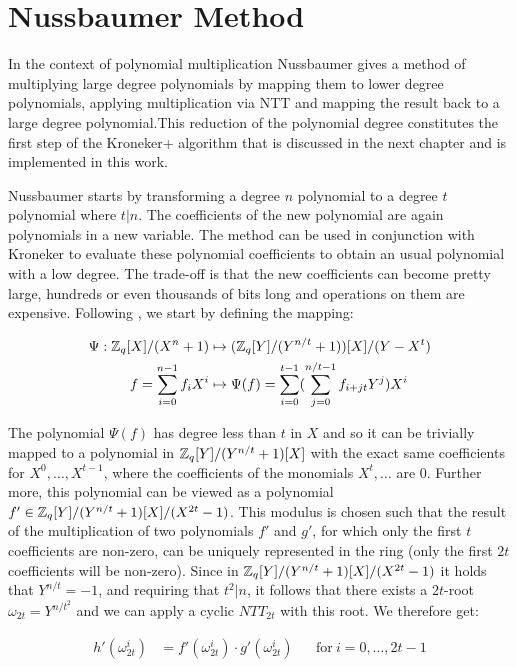 \chapter{Nussbaumer Method}

In the context of polynomial multiplication Nussbaumer \parencite{1163372} gives a method of multiplying large degree polynomials by mapping them to lower degree polynomials, applying multiplication via NTT and mapping the result back to a large degree polynomial.This reduction of the polynomial degree constitutes the first step of the Kroneker+ algorithm \parencite{cryptoeprint:2020/1303} that is discussed in the next chapter and is implemented in this work. 

Nussbaumer starts by transforming a degree $n$ polynomial to a degree $t$ polynomial where $t | n$. The coefficients of the new polynomial are again polynomials in a new variable. The method can be used in conjunction with Kroneker to evaluate these polynomial coefficients to obtain an usual polynomial with a low degree. The trade-off is that the new coefficients can become pretty large, hundreds or even thousands of bits long and operations on them are expensive. Following \parencite{cryptoeprint:2020/1303}, we start by defining the mapping:

\begin{align*}
    \Psi : \mathbb{Z}_q[X]/(X^n + 1) &\mapsto (\mathbb{Z}_q[Y]/(Y^{n/t} + 1))[X] / (Y - X^t) \\
    f = \sum_{i=0}^{n-1} f_i X^i &\mapsto \Psi(f) = \sum_{i=0}^{t-1}(\sum_{j=0}^{n/t-1} f_{i+jt} Y^j) X^i
\end{align*}

The polynomial $\Psi(f)$ has degree less than $t$ in $X$ and so it can be trivially mapped to a polynomial in $\mathbb{Z}_q[Y]/(Y^{n/t} + 1)[X]$ with the exact same coefficients for $X^0, \ldots, X^{t-1}$, where the coefficients of the monomials $X^t, \ldots$ are $0$. Further more, this polynomial can be viewed as a polynomial $f' \in \mathbb{Z}_q[Y]/(Y^{n/t} + 1)[X]/(X^{2t} - 1)$. This modulus is chosen such that the result of the multiplication of two polynomials $f'$ and $g'$, for which only the first $t$ coefficients are non-zero, can be uniquely represented in the ring (only the first $2t$ coefficients will be non-zero). Since in $\mathbb{Z}_q[Y]/(Y^{n/t} + 1)[X]/(X^{2t} - 1)$ it holds that $Y^{n/t} = -1$, and requiring that $t^{2} | n$, it follows that there exists a $2t$-root $\omega_{2t} = Y^{n/t^2}$ and we can apply a cyclic $NTT_{2t}$ with this root. We therefore get:

\begin{align}\label{eq:3.mult}
    h'(\omega_{2t}^i) &= f'(\omega_{2t}^i) \cdot g'(\omega_{2t}^i) && \text{for}\ i = 0, \ldots, 2t-1
\end{align}

